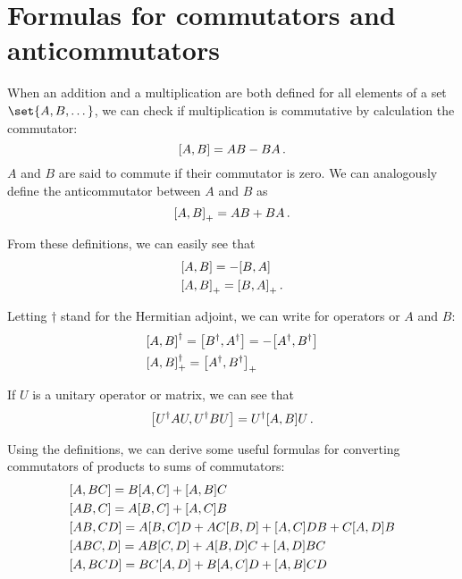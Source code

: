 \section{Formulas for commutators and anticommutators}
    When an addition and a multiplication are both defined for all elements of a set $\set{A, B, \dots}$, we can check if multiplication is commutative by calculation the commutator:
    \begin{equation}
        \comm{A}{B} = AB - BA \thinspace .
    \end{equation}
    $A$ and $B$ are said to commute if their commutator is zero. We can analogously define the anticommutator between $A$ and $B$ as
    \begin{equation}
        \comm{A}{B}_+ = AB + BA \thinspace .
    \end{equation}

    From these definitions, we can easily see that
    \begin{align}
        & \comm{A}{B} = - \comm{B}{A} \\
        & \comm{A}{B}_+ = \comm{B}{A}_+ \thinspace .
    \end{align}

    Letting $\dagger$ stand for the Hermitian adjoint, we can write for operators or $A$ and $B$:
    \begin{align}
        & \comm{A}{B}^\dagger = \comm{B^\dagger}{A^\dagger} = - \comm{A^\dagger}{B^\dagger} \\
        & \comm{A}{B}^\dagger_+ = \comm{A^\dagger}{B^\dagger}_+
    \end{align}

    If $U$ is a unitary operator or matrix, we can see that
    \begin{equation}
        \comm{U^\dagger A U}{U^\dagger B U } = U^\dagger \comm{A}{B} U \thinspace .
    \end{equation}

    Using the definitions, we can derive some useful formulas for converting commutators of products to sums of commutators:
    \begin{align}
        & \comm{A}{BC} = B \comm{A}{C} + \comm{A}{B} C \\
        & \comm{AB}{C} = A \comm{B}{C} + \comm{A}{C}B \\
        & \comm{AB}{CD} = A \comm{B}{C} D + AC \comm{B}{D} + \comm{A}{C} DB + C \comm{A}{D} B \\
        & \comm{ABC}{D} = AB \comm{C}{D} + A \comm{B}{D} C + \comm{A}{D} BC \\
        & \comm{A}{BCD} = BC \comm{A}{D} + B \comm{A}{C} D + \comm{A}{B} CD
    \end{align}

